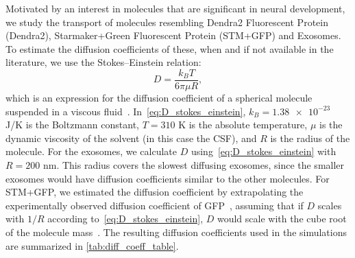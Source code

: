 \documentclass[fleqn]{wlscirep}
\begin{document}
Motivated by an interest in molecules that are significant in neural development, we study the transport of molecules resembling Dendra2 Fluorescent Protein (Dendra2), Starmaker+Green Fluorescent Protein (STM+GFP) and Exosomes. To estimate the diffusion coefficients of these, when and if not available in the literature, we use the Stokes--Einstein relation:
\begin{equation}
    D = \frac{k_B T}{6\pi \mu R} ,
    \label{eq:D_stokes_einstein}
\end{equation}
which is an expression for the diffusion coefficient of a spherical molecule suspended in a viscous fluid~\cite{Einstein1905UberTeilchen}. In~\eqref{eq:D_stokes_einstein}, $k_B = \num{1.38e-23}$ J/K is the Boltzmann constant, $T = 310$ K is the absolute temperature, $\mu$ is the dynamic viscosity of the solvent (in this case the CSF), and $R$ is the radius of the molecule. For the exosomes, we calculate $D$ using~\eqref{eq:D_stokes_einstein} with $R=200$ nm. This radius covers the slowest diffusing exosomes, since the smaller exosomes would have diffusion coefficients similar to the other molecules. For STM+GFP, we estimated the diffusion coefficient by extrapolating the experimentally observed diffusion coefficient of GFP~\cite{Swaminathan1997PhotobleachingDiffusion, Potma2001ReducedCells}, assuming that if $D$ scales with $1/R$ according to~\eqref{eq:D_stokes_einstein}, $D$ would scale with the cube root of the molecule mass~\cite{Goodhill1997DiffusionGuidance}. The resulting diffusion coefficients used in the simulations are summarized in \cref{tab:diff_coeff_table}.


\end{document}
